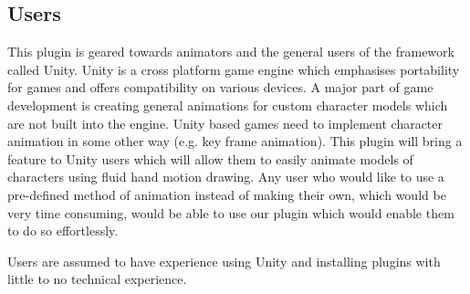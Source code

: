 \subsection{Users}
This plugin is geared towards animators and the general users of the framework called Unity. Unity is a cross platform game engine which emphasises portability for games and offers compatibility on various devices. A major part of game development is creating general animations for custom character models which are not built into the engine. Unity based games need to implement character animation in some other way (e.g. key frame animation). This plugin will bring a feature to Unity users which will allow them to easily animate models of characters using fluid hand motion drawing. Any user who would like to use a pre-defined method of animation instead of making their own, which would be very time consuming, would be able to use our plugin which would enable them to do so effortlessly.

Users are assumed to have experience using Unity and installing plugins with little to no technical experience.
